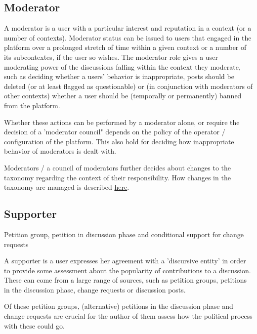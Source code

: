 \subsection{Moderator}
\label{ssec:Roles_Moderator}
A moderator is a user with a particular interest and reputation in a context (or a number of contexts). Moderator status can be issued to users that engaged in the platform over a prolonged stretch of time within a given context or a number of its subcontextes, if the user so wishes. The moderator role gives a user moderating power of the discussions falling within the context they moderate, such as deciding whether a users' behavior is inappropriate, posts should be deleted (or at least flagged as questionable) or (in conjunction with moderators of other contexts) whether a user should be (temporally or permanently) banned from the platform. 

Whether these actions can be performed by a moderator alone, or require the decision of a 'moderator council" depends on the policy of the operator / configuration of the platform. This also hold for deciding how inappropriate behavior of moderators is dealt with.

Moderators / a council of moderators further decides about changes to the taxonomy regarding the context of their responsibility. How changes in the taxonomy are managed is described \href{sec:Model_Contexts}{here}.

\subsection{Supporter}
\label{ssec:Roles_Supporter}
Petition group, petition in discussion phase and conditional support for change requests

A supporter is a user expresses her agreement with a 'discursive entity' in order to provide some assessment about the popularity of contributions to a discussion. These can come from a large range of sources, such as petition groups, petitions in the discussion phase, change requests or discussion posts. 

Of these petition groups, (alternative) petitions in the discussion phase and change requests are crucial for the author of them assess how the political process with these could go.

